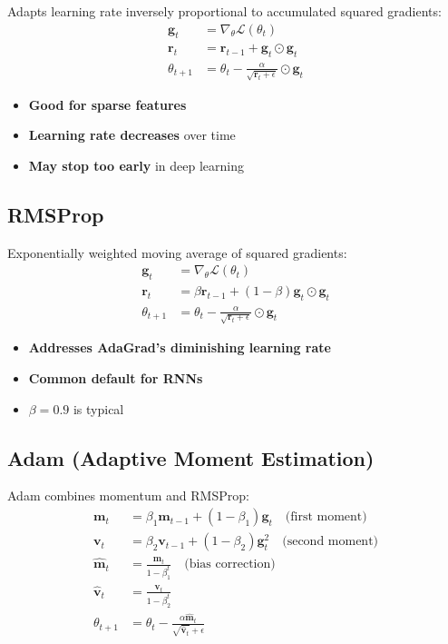 Adapts learning rate inversely proportional to accumulated squared gradients:
\begin{align}
\mathbf{g}_t &= \nabla_\theta \mathcal{L}(\theta_t) \\
\mathbf{r}_t &= \mathbf{r}_{t-1} + \mathbf{g}_t \odot \mathbf{g}_t \\
\theta_{t+1} &= \theta_t - \frac{\alpha}{\sqrt{\mathbf{r}_t + \epsilon}} \odot \mathbf{g}_t
\end{align}

\begin{itemize}
    \item \textbf{Good for sparse features}
    \item \textbf{Learning rate decreases} over time
    \item \textbf{May stop too early} in deep learning
\end{itemize}

\subsection{RMSProp}

Exponentially weighted moving average of squared gradients:
\begin{align}
\mathbf{g}_t &= \nabla_\theta \mathcal{L}(\theta_t) \\
\mathbf{r}_t &= \beta \mathbf{r}_{t-1} + (1-\beta)\mathbf{g}_t \odot \mathbf{g}_t \\
\theta_{t+1} &= \theta_t - \frac{\alpha}{\sqrt{\mathbf{r}_t + \epsilon}} \odot \mathbf{g}_t
\end{align}

\begin{itemize}
    \item \textbf{Addresses AdaGrad's diminishing learning rate}
    \item \textbf{Common default for RNNs}
    \item $\beta = 0.9$ is typical
\end{itemize}

\subsection{Adam (Adaptive Moment Estimation)}

Adam \cite{kingma2014adam} combines momentum and RMSProp:
\begin{align}
\mathbf{m}_t &= \beta_1 \mathbf{m}_{t-1} + (1-\beta_1)\mathbf{g}_t \quad \text{(first moment)} \\
\mathbf{v}_t &= \beta_2 \mathbf{v}_{t-1} + (1-\beta_2)\mathbf{g}_t^2 \quad \text{(second moment)} \\
\hat{\mathbf{m}}_t &= \frac{\mathbf{m}_t}{1-\beta_1^t} \quad \text{(bias correction)} \\
\hat{\mathbf{v}}_t &= \frac{\mathbf{v}_t}{1-\beta_2^t} \\
\theta_{t+1} &= \theta_t - \frac{\alpha \hat{\mathbf{m}}_t}{\sqrt{\hat{\mathbf{v}}_t} + \epsilon}
\end{align}

